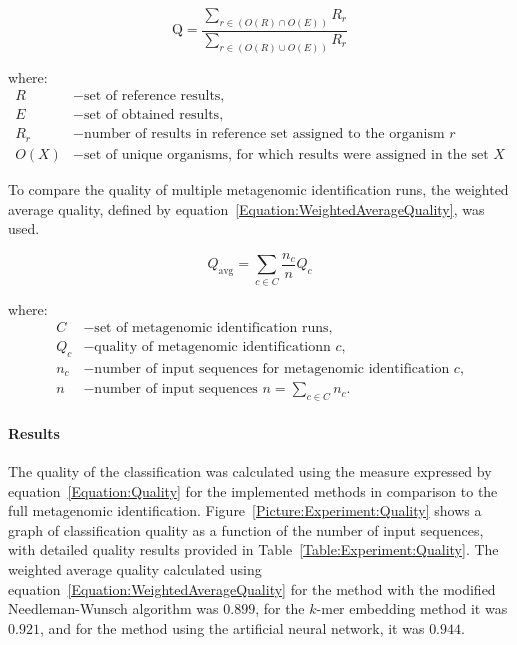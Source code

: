 \documentclass[pdflatex,sn-vancouver-num]{sn-jnl}%
\begin{document}
            \begin{equation}
                \text{Q} = \frac{
                    \sum_{r \in (O(R) \cap O(E))} R_{r}
                }{
                    \sum_{r \in (O(R) \cup O(E))} R_{r}
                }
                \label{Equation:Quality}
            \end{equation}

            where:
            \begin{align*}
                R &- \text{set of reference results,} \\
                E &- \text{set of obtained results,} \\
                R_{r} &- \text{number of results in reference set assigned to the organism $r$} \\
                O(X) &- \text{set of unique organisms, for which results were assigned in the set $X$}
            \end{align*}

            To compare the quality of multiple metagenomic identification runs, the weighted average quality, defined by equation~\ref{Equation:WeightedAverageQuality}, was used.
            
            \begin{equation}
                Q_{\text{avg}} = \sum_{c \in C} \frac{n_c}{n} Q_c
                \label{Equation:WeightedAverageQuality}
            \end{equation}

            where:
            \begin{align*}
            C &- \text{set of metagenomic identification runs,} \\
            Q_c &- \text{quality of metagenomic identificationn $c$,} \\
            n_c &- \text{number of input sequences for metagenomic identification $c$,}\\
            n   &- \text{number of input sequences $n = \sum_{c \in C} n_{c}.$}
            \end{align*}

                  

                \paragraph{Results}
                The quality of the classification was calculated using the measure expressed by equation~\ref{Equation:Quality} for the implemented methods in comparison to the full metagenomic identification. Figure~\ref{Picture:Experiment:Quality} shows a graph of classification quality as a function of the number of input sequences, with detailed quality results provided in Table~\ref{Table:Experiment:Quality}. The weighted average quality calculated using equation~\ref{Equation:WeightedAverageQuality} for the method with the modified Needleman-Wunsch algorithm was $0.899$, for the $k$-mer embedding method it was $0.921$, and for the method using the artificial neural network, it was $0.944$.
\end{document}
